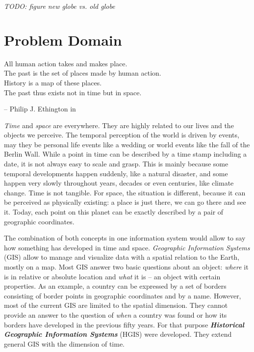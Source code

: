 \emph{TODO: figure new globe vs. old globe}


\newpage
\section{Problem Domain} %
\label{sec:problem_domain}

\begin{quoteit}
  All human action takes and makes place. \\
  The past is the set of places made by human action. \\
  History is a map of these places. \\
  The past thus exists not in time but in space.
\end{quoteit}
\hfill -- Philip J. Ethington in \cite[précis]{citeTakeMakePlace}

\emph{Time} and \emph{space} are everywhere. They are highly related to our lives and the objects we perceive. The temporal perception of the world is driven by events, may they be personal life events like a wedding or world events like the fall of the Berlin Wall. While a point in time can be described by a time stamp including a date, it is not always easy to scale and grasp. This is mainly because some temporal developments happen suddenly, like a natural disaster, and some happen very slowly throughout years, decades or even centuries, like climate change. Time is not tangible. For space, the situation is different, because it can be perceived as physically existing: a place is just there, we can go there and see it. Today, each point on this planet can be exactly described by a pair of geographic coordinates.

The combination of both concepts in one information system would allow to say how something has developed in time and space. \emph{Geographic Information Systems} (GIS) allow to manage and visualize data with a spatial relation to the Earth, mostly on a map. Most GIS answer two basic questions about an object: \emph{where} it is in relative or absolute location and \emph{what} it is -- an object with certain properties. As an example, a country can be expressed by a set of borders consisting of border points in geographic coordinates and by a name. However, most of the current GIS are limited to the spatial dimension. They cannot provide an answer to the question of \emph{when} a country was found or how its borders have developed in the previous fifty years. For that purpose \textbf{\emph{Historical Geographic Information Systems}} (HGIS) were developed. They extend general GIS with the dimension of time.

